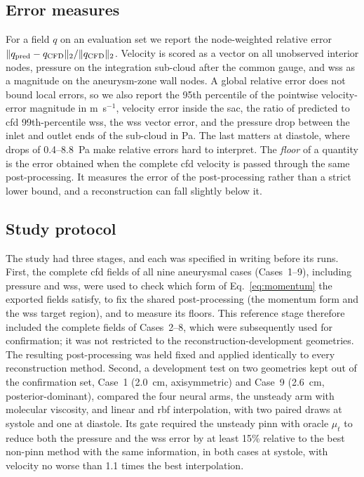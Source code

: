 \documentclass[12pt,a4paper]{article}
\newcommand{\cfdrevision}[1]{#1} %
\newcommand{\CFD}{\ac{cfd}\xspace}
\newcommand{\PINN}{\ac{pinn}\xspace}
\newcommand{\WSS}{\ac{wss}\xspace}
\newcommand{\RBF}{\ac{rbf}\xspace}
\theoremstyle{definition}
\numberwithin{equation}{section}
\providecommand{\DIFaddtex}[1]{{\protect\color{blue} \sf #1}} %
\providecommand{\DIFdeltex}[1]{{\protect\color{red} \scriptsize #1}} %
\providecommand{\DIFaddbegin}{} %
\providecommand{\DIFaddend}{} %
\providecommand{\DIFdelbegin}{} %
\providecommand{\DIFdelend}{} %
\providecommand{\DIFadd}[1]{\texorpdfstring{\DIFaddtex{#1}}{#1}} %
\providecommand{\DIFdel}[1]{\texorpdfstring{\DIFdeltex{#1}}{}} %
\newcommand{\DIFscaledelfig}{0.5}
\newlength{\DIFdelgraphicswidth} %
\newlength{\DIFdelgraphicsheight} %
\newcommand{\DIFaddincludegraphics}[2][]{{\color{blue}\fbox{\DIFOincludegraphics[#1]{#2}}}} %
\newcommand{\DIFdelincludegraphics}[2][]{%
\sbox{\DIFdelgraphicsbox}{\DIFOincludegraphics[#1]{#2}}%
\settoboxwidth{\DIFdelgraphicswidth}{\DIFdelgraphicsbox} %
\settoboxtotalheight{\DIFdelgraphicsheight}{\DIFdelgraphicsbox} %
\scalebox{\DIFscaledelfig}{%
\parbox[b]{\DIFdelgraphicswidth}{\usebox{\DIFdelgraphicsbox}\\[-\baselineskip] \rule{\DIFdelgraphicswidth}{0em}}\llap{\resizebox{\DIFdelgraphicswidth}{\DIFdelgraphicsheight}{%
\setlength{\unitlength}{\DIFdelgraphicswidth}%
\begin{picture}(1,1)%
\thicklines\linethickness{2pt} %
{\color[rgb]{1,0,0}\put(0,0){\framebox(1,1){}}}%
{\color[rgb]{1,0,0}\put(0,0){\line( 1,1){1}}}%
{\color[rgb]{1,0,0}\put(0,1){\line(1,-1){1}}}%
\end{picture}%
}\hspace*{3pt}}} %
} %
\DeclareRobustCommand{\DIFaddbegin}{\DIFOaddbegin \let\includegraphics\DIFaddincludegraphics} %
\DeclareRobustCommand{\DIFaddend}{\DIFOaddend \let\includegraphics\DIFOincludegraphics} %
\DeclareRobustCommand{\DIFdelbegin}{\DIFOdelbegin \let\includegraphics\DIFdelincludegraphics} %
\DeclareRobustCommand{\DIFdelend}{\DIFOaddend \let\includegraphics\DIFOincludegraphics} %
\renewcommand{\DIFaddtex}[1]{{\protect\color{red}#1}}
\renewcommand{\DIFdeltex}[1]{}
\renewcommand{\DIFdel}[1]{}
\renewcommand{\DIFaddincludegraphics}[2][]{\DIFOincludegraphics[#1]{#2}}
\renewcommand{\DIFdelincludegraphics}[2][]{}
\renewcommand{\cfdrevision}[1]{\textcolor{red}{#1}}
\def\DIFaddbegin{}\def\DIFaddend{}%
\def\DIFdelbegin{}\def\DIFdelend{}%
\def\cfdrevision#1{#1}%
\begin{document}
\subsection{Error measures}
\label{sec:metrics}
For a field $q$ on an evaluation set we report the node-weighted relative error $\|q_{\rm pred}-q_{\rm CFD}\|_2/\|q_{\rm CFD}\|_2$. Velocity is scored as a vector on all unobserved interior nodes, pressure on the integration sub-cloud after the common gauge, and \WSS as a magnitude on the aneurysm-zone wall nodes. A global relative error does not bound local errors, so we also report the 95th percentile of the pointwise velocity-error magnitude in m~s$^{-1}$, velocity error inside the sac, the ratio of predicted to \CFD 99th-percentile \WSS, the \WSS vector error, and the pressure drop between the inlet and outlet ends of the sub-cloud in Pa. The last matters at diastole, where drops of 0.4--8.8~Pa make relative errors hard to interpret. The \emph{floor} of a quantity is the error obtained when the complete \CFD velocity is passed through the same post-processing. It measures the error of the post-processing rather than a strict lower bound, and a reconstruction can fall slightly below it.

\subsection{Study protocol}
\label{sec:protocol}
The study had three stages, and each was specified in writing before its runs. \DIFdelbegin \DIFdel{First, the complete }%
\DIFdel{fields of all nine aneurysmal cases were used to check which form of Eq.~\eqref{eq:momentum} the exported fields satisfy and to measure the post-processing floors. This stage used the complete fields of Cases~2--8, pressure and }%
\DIFdel{included, to fix the shared post-processing, namely the momentum form and the }%
\DIFdel{target region. Because every method passes through that post-processing, this choice favors none of them. }\DIFdelend \DIFaddbegin \DIFadd{\cfdrevision{First, the complete \CFD fields of all nine aneurysmal cases (Cases~1--9), including pressure and \WSS, were used to check which form of Eq.~\eqref{eq:momentum} the exported fields satisfy, to fix the shared post-processing (the momentum form and the \WSS target region), and to measure its floors. This reference stage therefore included the complete fields of Cases~2--8, which were subsequently used for confirmation; it was not restricted to the reconstruction-development geometries. The resulting post-processing was held fixed and applied identically to every reconstruction method.} }\DIFaddend Second, a development test on two geometries kept out of the confirmation set, Case~1 (2.0~cm, axisymmetric) and Case~9 (2.6~cm, posterior-dominant), compared the four neural arms, the unsteady arm with molecular viscosity, and linear and \RBF interpolation, with two paired draws at systole and one at diastole. Its gate required the unsteady \PINN with oracle $\mu_t$ to reduce both the pressure and the \WSS error by at least 15\% relative to the best non-\PINN method with the same information, in both cases at systole, with velocity no worse than 1.1 times the best interpolation.
\end{document}
